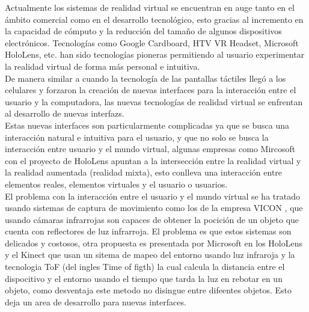 Actualmente los sistemas de \gls{realidad virtual} se encuentran en auge tanto en el ámbito comercial como en el desarrollo tecnológico, esto gracias al incremento en la capacidad de cómputo y la reducción del tamaño de algunos dispositivos electrónicos. Tecnologías como Google Cardboard, HTV VR Headset, Microsoft HoloLens, etc. han sido tecnologías pioneras permitiendo al usuario experimentar la realidad virtual de forma más personal e intuitiva.\\

De manera similar a cuando la tecnología de las pantallas táctiles llegó a los celulares y forzaron la creación de nuevas interfaces para la interacción entre el usuario y la computadora, las nuevas tecnologías de realidad virtual se enfrentan al desarrollo de nuevas \glspl{interfaz}.\\

Estas nuevas interfaces son particularmente complicadas ya que se busca una interacción natural e intuitiva para el usuario, y que no solo se busca la interacción entre usuario y el mundo virtual, algunas empresas como Mircosoft con el proyecto de HoloLens apuntan a la intersección entre la realidad virtual y la realidad aumentada (realidad mixta), esto conlleva una interacción entre elementos reales, elementos virtuales y el usuario o usuarios.\\

El problema con la interacción entre el usuario y el mundo virtual se ha tratado usando sistemas de captura de movimiento como los de la empresa VICON \cite{vicon}, que usando cámaras infrarrojas son capaces de obtener la pocición de un objeto que cuenta con reflectores de luz infrarroja. El problema es que estos sistemas son delicados y costosos, otra propuesta es presentada por Microsoft en los HoloLens y el Kinect que usan un sitema de mapeo del entorno usando luz infraroja y la tecnologia ToF (del ingles Time of figth) la cual calcula la distancia entre el dispocitivo y el entorno usando el tiempo que tarda la luz en rebotar en un objeto, como desventaja este metodo no disingue entre difeentes objetos. Esto deja un area de desarrollo para nuevas interfaces.\\



